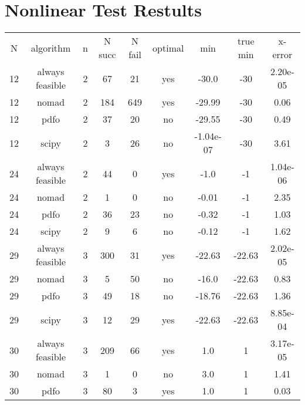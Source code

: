\chapter{Nonlinear Test Restults}

\begin{scriptsize}
\begin{center}
\begin{longtable}{ccccccccc}
\label{nonlinear_results}
  N &       algorithm &  n & N succ & N fail & optimal &         min &    true min &  x-error\\
 12 & always feasible &  2 &     67 &     21 &     yes &       -30.0 &         -30 & 2.20e-05\\
 12 &           nomad &  2 &    184 &    649 &     yes &      -29.99 &         -30 &     0.06\\
 12 &            pdfo &  2 &     37 &     20 &      no &      -29.55 &         -30 &     0.49\\
 12 &           scipy &  2 &      3 &     26 &      no &   -1.04e-07 &         -30 &     3.61\\
 24 & always feasible &  2 &     44 &      0 &     yes &        -1.0 &          -1 & 1.04e-06\\
 24 &           nomad &  2 &      1 &      0 &      no &       -0.01 &          -1 &     2.35\\
 24 &            pdfo &  2 &     36 &     23 &      no &       -0.32 &          -1 &     1.03\\
 24 &           scipy &  2 &      9 &      6 &      no &       -0.12 &          -1 &     1.62\\
 29 & always feasible &  3 &    300 &     31 &     yes &      -22.63 &      -22.63 & 2.02e-05\\
 29 &           nomad &  3 &      5 &     50 &      no &       -16.0 &      -22.63 &     0.83\\
 29 &            pdfo &  3 &     49 &     18 &      no &      -18.76 &      -22.63 &     1.36\\
 29 &           scipy &  3 &     12 &     29 &     yes &      -22.63 &      -22.63 & 8.85e-04\\
 30 & always feasible &  3 &    209 &     66 &     yes &         1.0 &           1 & 3.17e-05\\
 30 &           nomad &  3 &      1 &      0 &      no &         3.0 &           1 &     1.41\\
 30 &            pdfo &  3 &     80 &      3 &     yes &         1.0 &           1 &     0.03\\

\end{longtable}
\end{center}
\end{scriptsize}
